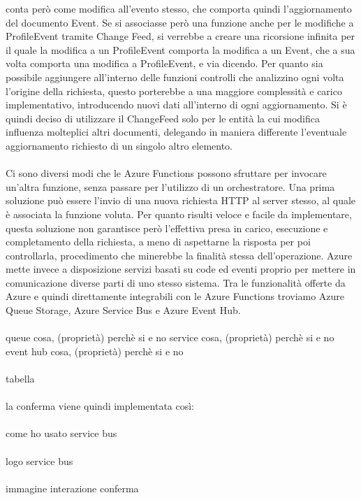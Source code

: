 conta però come modifica all'evento stesso, 
che comporta quindi l'aggiornamento del documento Event.
Se si associasse però una funzione anche per le modifiche a ProfileEvent tramite Change Feed,
si verrebbe a creare una ricorsione infinita per il quale la modifica a un ProfileEvent 
comporta la modifica a un Event, che a sua volta comporta una modifica a ProfileEvent, e via dicendo.
Per quanto sia possibile aggiungere all'interno delle funzioni controlli 
che analizzino ogni volta l'origine della richiesta,
questo porterebbe a una maggiore complessità e carico implementativo,
introducendo nuovi dati all'interno di ogni aggiornamento. 
Si è quindi deciso di utilizzare il ChangeFeed solo per le entità 
la cui modifica influenza molteplici altri documenti,
delegando in maniera differente l'eventuale aggiornamento  richiesto di un singolo altro elemento.\\
\\
Ci sono diversi modi che le Azure Functions possono sfruttare 
per invocare un'altra funzione, senza passare per l'utilizzo di un orchestratore.
Una prima soluzione può essere l'invio di una nuova richiesta HTTP al server stesso,
al quale è associata la funzione voluta.
Per quanto risulti veloce e facile da implementare,
questa soluzione non garantisce però l'effettiva presa in carico, esecuzione e completamento della richiesta,
a meno di aspettarne la risposta per poi controllarla,
procedimento che minerebbe la finalità stessa dell'operazione.
Azure mette invece a disposizione servizi basati su code ed eventi 
proprio per mettere in comunicazione diverse parti di uno stesso sistema. 
Tra le funzionalità offerte da Azure e 
quindi direttamente integrabili con le Azure Functions troviamo 
Azure Queue Storage, Azure Service Bus e Azure Event Hub.\\
\\

queue cosa, (proprietà) perchè si e no
service cosa, (proprietà) perchè si e no
event hub cosa, (proprietà) perchè si e no \\
\\
tabella \\
\\
la conferma viene quindi implementata così:\\
\\
come ho usato service bus\\
\\
logo service bus\\
\\
immagine interazione conferma\\
\\






